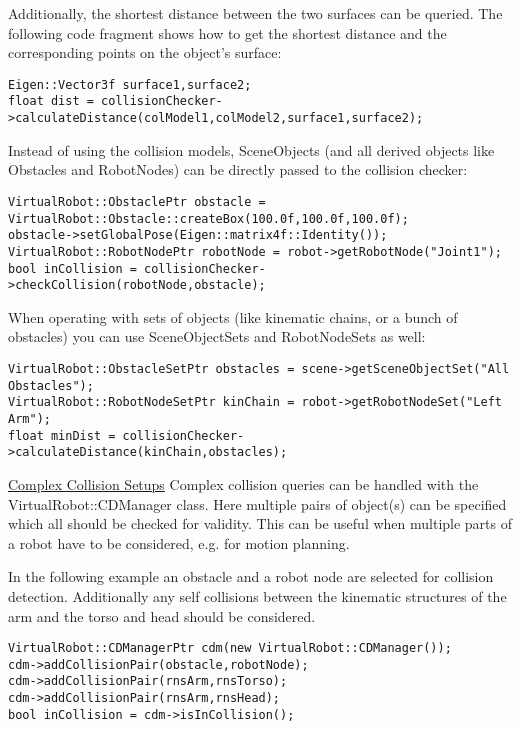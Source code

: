 Additionally, the shortest distance between the two surfaces can be queried. The following code fragment shows how to get the shortest distance and the corresponding points on the object's surface: 
\begin{lstlisting}
Eigen::Vector3f surface1,surface2;
float dist = collisionChecker->calculateDistance(colModel1,colModel2,surface1,surface2);
\end{lstlisting}
Instead of using the collision models, SceneObjects (and all derived objects like Obstacles and RobotNodes) can be directly passed to the collision checker: 
\begin{lstlisting}
VirtualRobot::ObstaclePtr obstacle = VirtualRobot::Obstacle::createBox(100.0f,100.0f,100.0f);
obstacle->setGlobalPose(Eigen::matrix4f::Identity());
VirtualRobot::RobotNodePtr robotNode = robot->getRobotNode("Joint1");
bool inCollision = collisionChecker->checkCollision(robotNode,obstacle);
\end{lstlisting}
When operating with sets of objects (like kinematic chains, or a bunch of obstacles) you can use SceneObjectSets and RobotNodeSets as well: 
\begin{lstlisting}
VirtualRobot::ObstacleSetPtr obstacles = scene->getSceneObjectSet("All Obstacles");
VirtualRobot::RobotNodeSetPtr kinChain = robot->getRobotNodeSet("Left Arm");
float minDist = collisionChecker->calculateDistance(kinChain,obstacles);
\end{lstlisting}
\underline{Complex Collision Setups}
Complex collision queries can be handled with the VirtualRobot::CDManager class. Here multiple pairs of object(s) can be specified which all should be checked for validity. This can be useful when multiple parts of a robot have to be considered, e.g. for motion planning.
\par
In the following example an obstacle and a robot node are selected for collision detection. Additionally any self collisions between the kinematic structures of the arm and the torso and head should be considered.  
\begin{lstlisting}
VirtualRobot::CDManagerPtr cdm(new VirtualRobot::CDManager());
cdm->addCollisionPair(obstacle,robotNode);
cdm->addCollisionPair(rnsArm,rnsTorso);
cdm->addCollisionPair(rnsArm,rnsHead);
bool inCollision = cdm->isInCollision();
\end{lstlisting}
